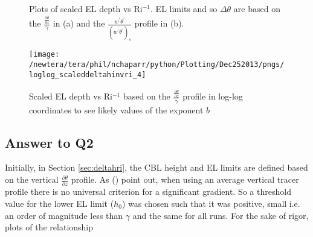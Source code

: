 \begin{figure}[htbp]
\begin{minipage}[b]{0.5\linewidth}
        \\
        \end{minipage}             
\quad
\begin{minipage}[b]{0.5\linewidth}
        \\      
       \end{minipage}
        \caption[scaled \acs{EL} depth vs \acs{Ri}$^{-1}$]{Plots of scaled \acs{EL} depth vs \acs{Ri}$^{-1}$. \acs{EL} limits and so $\Delta \theta$ are based on the $\frac{\frac{\partial \overline{\theta}}{\partial z}}{\gamma}$ in (a) and the $\frac{\overline{w^{'}\theta^{'}}}{(\overline{w^{'}\theta^{'}})_{s}}$ profile in (b).}
        \label{fig:deltahinvri_scaled}
\end{figure}

\begin{figure}[htbp]
\centering
\texttt{[image: /newtera/tera/phil/nchaparr/python/Plotting/Dec252013/pngs/loglog\_scaleddeltahinvri\_4]}\\
\caption[Log-log plot of scaled \acs{EL} depth vs \acs{Ri}$^{-1}$]{Scaled \acs{EL} depth vs \acs{Ri}$^{-1}$ based on the $\frac{\frac{\partial \overline{\theta}}{\partial z}}{\gamma}$ profile in log-log coordinates to see likely values of the exponent $b$}
\label{fig:loglogdeltahinvri}
\end{figure}

\subsection{Answer to Q2}

Initially, in Section \ref{sec:deltahri}, the \acs{CBL} height and \acs{EL} limits are defined based on the vertical  $\frac{\partial \overline{\theta}}{\partial z}$ profile.  As \citeauthor{BrooksFowler2} (\citeyear{BrooksFowler2}) point out, when using an average vertical tracer profile there is no universal criterion for a significant gradient.  So a threshold value for the lower \acs{EL} limit ($h_{0}$) was chosen such that it was positive, small i.e. an order of magnitude less than $\gamma$ and the same for all runs.  For the sake of rigor, plots of the relationship

